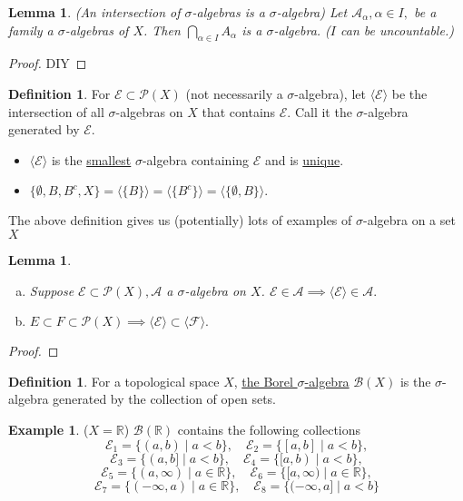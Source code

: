 \documentclass{report}
\newcommand{\R}{\mathbb{R}}
\newtheorem{lemma}[theorem]{Lemma}
\theoremstyle{definition}
\newtheorem{definition}[theorem]{Definition}
\newtheorem{example}[theorem]{Example}
\theoremstyle{remark}
\begin{document}
\begin{lemma}(An intersection of $\sigma$-algebras is a $\sigma$-algebra)
Let $\mathcal{A}_\alpha, \alpha \in I,$ be a family a $\sigma$-algebras of $X$. Then $\bigcap_{\alpha \in I} A_\alpha$ is a $\sigma$-algebra. ($I$ can be uncountable.)
\end{lemma}
\begin{proof}
DIY
\end{proof}

\begin{definition}
For $\mathcal{E} \subset \mathcal{P}(X)$ (not necessarily a $\sigma$-algebra), let $\langle \mathcal{E}\rangle$ be the intersection of all $\sigma$-algebras on $X$ that contains $\mathcal{E}.$ Call it the $\sigma$-algebra generated by $\mathcal{E}.$
\end{definition}
\begin{itemize}
\item $\langle \mathcal{E}\rangle$ is the \underline{smallest} $\sigma$-algebra containing $\mathcal{E}$ and is \underline{unique}.
\item $\{\emptyset, B, B^c, X\} = \langle \{B\} \rangle = \langle \{B^c\}\rangle = \langle \{\emptyset, B\}\rangle.$
\end{itemize}

The above definition gives us (potentially) lots of examples of $\sigma$-algebra on a set $X$

\begin{lemma}\label{le:1.5}
\begin{enumerate}[(a)]
\item
	Suppose $\mathcal{E} \subset \mathcal{P}(X), \mathcal{A}$ a $\sigma$-algebra on $X$. $\mathcal{E} \in \mathcal{A} \implies \langle\mathcal{E}\rangle \in \mathcal{A}.$
\item
	$E \subset F \subset \mathcal{P}(X) \implies \langle \mathcal{E} \rangle \subset \langle\mathcal{F}\rangle.$
\end{enumerate}
\end{lemma}
\begin{proof}

\end{proof}

\begin{definition}
For a topological space $X$, \underline{the Borel $\sigma$-algebra} $\mathcal{B}(X)$ is the $\sigma$-algebra generated by the collection of open sets.
\end{definition}

\begin{example}($X = \R$)
$\mathcal{B}(\R)$ contains the following collections
\[\mathcal{E}_1 = \{(a, b) \mid a < b\}, \quad \mathcal{E}_2 = \{[a, b] \mid a < b\},\]
\[\mathcal{E}_3 = \{(a, b] \mid a < b\}, \quad \mathcal{E}_4 = \{[a, b) \mid a < b\},\]
\[\mathcal{E}_5 = \{(a, \infty) \mid a \in \R\}, \quad \mathcal{E}_6 = \{[a, \infty) \mid a \in \R \},\]
\[\mathcal{E}_7 = \{(-\infty, a) \mid a \in \R\}, \quad \mathcal{E}_8 = \{(-\infty, a] \mid a < b\}\]
\end{example}
\end{document}
